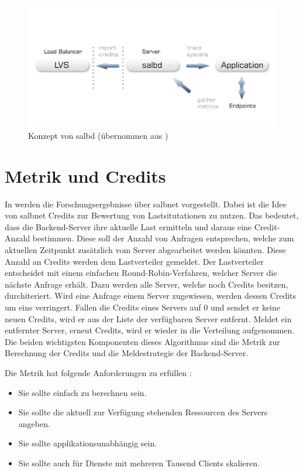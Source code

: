\documentclass[a4paper, 12pt, BCOR10mm, DIV12, toc=bibliography, toc=listof, german]{scrbook}
\begin{document}

		\begin{figure}
			\centering
			\includegraphics[width=\textwidth]{images/salbd-concept.png}
			\caption{Konzept von salbd (übernommen aus \cite{zinke2012})}
			\label{fig:salbd}
		\end{figure}

		\section{Metrik und Credits} %
		\label{sec:metrik}

			In \cite{zinke2012} werden die Forschungsergebnisse über salbnet vorgestellt.  Dabei ist die
			Idee von salbnet Credits zur Bewertung von Lastsitutationen zu nutzen. Das bedeutet, dass die
			Backend-Server ihre aktuelle Last ermitteln und daraus eine Credit-Anzahl bestimmen. Diese
			soll der Anzahl von Anfragen entsprechen, welche zum aktuellen Zeitpunkt zusätzlich vom Server
			abgearbeitet werden könnten. Diese Anzahl an Credits werden dem Lastverteiler gemeldet. Der
			Lastverteiler entscheidet mit einem einfachen Round-Robin-Verfahren, welcher Server die
			nächste Anfrage erhält.  Dazu werden alle Server, welche noch Credits besitzen, durchiteriert.
			Wird eine Anfrage einem Server zugewiesen, werden dessen Credits um eins verringert. Fallen
			die Credits eines Servers auf 0 und sendet er keine neuen Credits, wird er aus der Liste der
			verfügbaren Server entfernt. Meldet ein entfernter Server, erneut Credits, wird er wieder in
			die Verteilung aufgenommen. Die beiden wichtigsten Komponenten dieses Algorithmus sind die
			Metrik zur Berechnung der Credits und die Meldestrategie der Backend-Server.

			Die Metrik hat folgende Anforderungen zu erfüllen \cite{scsczile2008}:

			\begin{itemize}
				\item Sie sollte einfach zu berechnen sein.
				\item Sie sollte die aktuell zur Verfügung stehenden Ressourcen des Servers angeben.
				\item Sie sollte applikationsunabhängig sein.
				\item Sie sollte auch für Dienste mit mehreren Tausend Clients skalieren.
			\end{itemize}
\end{document}

